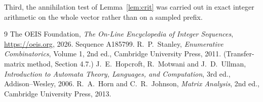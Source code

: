 \documentclass[11pt,a4paper]{article}
\theoremstyle{plain}
\theoremstyle{definition}
\begin{document}
Third, the annihilation test of Lemma~\ref{lem:crit} was carried out in exact integer
arithmetic on the whole vector rather than on a sampled prefix.

\begin{thebibliography}{9}
 The OEIS Foundation, \emph{The On-Line Encyclopedia of Integer
Sequences}, \url{https://oeis.org}, 2026. Sequence A185799.
 R.~P.~Stanley, \emph{Enumerative Combinatorics}, Volume 1, 2nd ed.,
Cambridge University Press, 2011. (Transfer-matrix method, Section 4.7.)
 J.~E.~Hopcroft, R.~Motwani and J.~D.~Ullman, \emph{Introduction to Automata
Theory, Languages, and Computation}, 3rd ed., Addison--Wesley, 2006.
 R.~A.~Horn and C.~R.~Johnson, \emph{Matrix Analysis}, 2nd ed., Cambridge
University Press, 2013.
\end{thebibliography}
\end{document}
